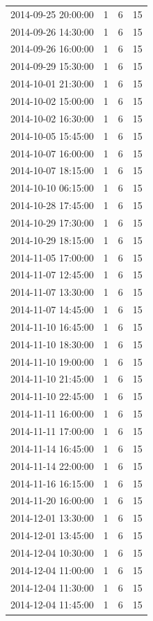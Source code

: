 \begin{tabular}{lrrr}
2014-09-25 20:00:00 & 1 & 6 & 15 \\
2014-09-26 14:30:00 & 1 & 6 & 15 \\
2014-09-26 16:00:00 & 1 & 6 & 15 \\
2014-09-29 15:30:00 & 1 & 6 & 15 \\
2014-10-01 21:30:00 & 1 & 6 & 15 \\
2014-10-02 15:00:00 & 1 & 6 & 15 \\
2014-10-02 16:30:00 & 1 & 6 & 15 \\
2014-10-05 15:45:00 & 1 & 6 & 15 \\
2014-10-07 16:00:00 & 1 & 6 & 15 \\
2014-10-07 18:15:00 & 1 & 6 & 15 \\
2014-10-10 06:15:00 & 1 & 6 & 15 \\
2014-10-28 17:45:00 & 1 & 6 & 15 \\
2014-10-29 17:30:00 & 1 & 6 & 15 \\
2014-10-29 18:15:00 & 1 & 6 & 15 \\
2014-11-05 17:00:00 & 1 & 6 & 15 \\
2014-11-07 12:45:00 & 1 & 6 & 15 \\
2014-11-07 13:30:00 & 1 & 6 & 15 \\
2014-11-07 14:45:00 & 1 & 6 & 15 \\
2014-11-10 16:45:00 & 1 & 6 & 15 \\
2014-11-10 18:30:00 & 1 & 6 & 15 \\
2014-11-10 19:00:00 & 1 & 6 & 15 \\
2014-11-10 21:45:00 & 1 & 6 & 15 \\
2014-11-10 22:45:00 & 1 & 6 & 15 \\
2014-11-11 16:00:00 & 1 & 6 & 15 \\
2014-11-11 17:00:00 & 1 & 6 & 15 \\
2014-11-14 16:45:00 & 1 & 6 & 15 \\
2014-11-14 22:00:00 & 1 & 6 & 15 \\
2014-11-16 16:15:00 & 1 & 6 & 15 \\
2014-11-20 16:00:00 & 1 & 6 & 15 \\
2014-12-01 13:30:00 & 1 & 6 & 15 \\
2014-12-01 13:45:00 & 1 & 6 & 15 \\
2014-12-04 10:30:00 & 1 & 6 & 15 \\
2014-12-04 11:00:00 & 1 & 6 & 15 \\
2014-12-04 11:30:00 & 1 & 6 & 15 \\
2014-12-04 11:45:00 & 1 & 6 & 15 \\

\end{tabular}
